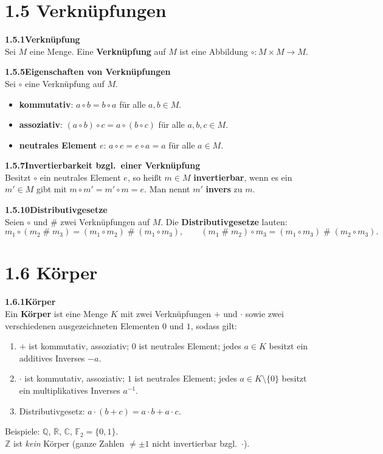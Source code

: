 \documentclass[a4paper,12pt]{article}
\newcommand{\gentry}[3]{%
  \noindent\textbf{#1\quad #2}\nopagebreak\\[0.2em]
  #3\par\smallskip
}
\begin{document}
\section*{1.5 \quad Verknüpfungen}

\gentry{1.5.1}{Verknüpfung}{%
  Sei $M$ eine Menge. Eine \textbf{Verknüpfung} auf $M$ ist eine Abbildung
  $\circ: M \times M \to M$.
}

\gentry{1.5.5}{Eigenschaften von Verknüpfungen}{%
  Sei $\circ$ eine Verknüpfung auf $M$.
  \begin{itemize}[topsep=2pt,itemsep=1pt]
    \item \textbf{kommutativ}: $a \circ b = b \circ a$ für alle $a,b \in M$.
    \item \textbf{assoziativ}: $(a \circ b) \circ c = a \circ (b \circ c)$
          für alle $a,b,c \in M$.
    \item \textbf{neutrales Element} $e$: $a \circ e = e \circ a = a$
          für alle $a \in M$.
  \end{itemize}
}

\gentry{1.5.7}{Invertierbarkeit bzgl.\ einer Verknüpfung}{%
  Besitzt $\circ$ ein neutrales Element $e$, so heißt $m \in M$
  \textbf{invertierbar}, wenn es ein $m' \in M$ gibt mit
  $m \circ m' = m' \circ m = e$.
  Man nennt $m'$ \textbf{invers} zu $m$.
}

\gentry{1.5.10}{Distributivgesetze}{%
  Seien $\circ$ und $\#$ zwei Verknüpfungen auf $M$. Die
  \textbf{Distributivgesetze} lauten:
  \[
    m_1 \circ (m_2 \mathbin{\#} m_3) = (m_1 \circ m_2) \mathbin{\#} (m_1 \circ m_3),
    \qquad
    (m_1 \mathbin{\#} m_2) \circ m_3 = (m_1 \circ m_3) \mathbin{\#} (m_2 \circ m_3).
  \]
}

\section*{1.6 \quad Körper}

\gentry{1.6.1}{Körper}{%
  Ein \textbf{Körper} ist eine Menge $K$ mit zwei Verknüpfungen $+$ und $\cdot$
  sowie zwei verschiedenen ausgezeichneten Elementen $0$ und $1$, sodass gilt:
  \begin{enumerate}[label=(\roman*),topsep=2pt,itemsep=1pt]
    \item $+$ ist kommutativ, assoziativ; $0$ ist neutrales Element;
          jedes $a \in K$ besitzt ein additives Inverses $-a$.
    \item $\cdot$ ist kommutativ, assoziativ; $1$ ist neutrales Element;
          jedes $a \in K \setminus \{0\}$ besitzt ein multiplikatives
          Inverses $a^{-1}$.
    \item Distributivgesetz: $a \cdot (b+c) = a \cdot b + a \cdot c$.
  \end{enumerate}
  Beispiele: $\mathbb{Q}$, $\mathbb{R}$, $\mathbb{C}$, $\mathbb{F}_2 = \{0,1\}$.
  \smallskip\\
  $\mathbb{Z}$ ist \emph{kein} Körper (ganze Zahlen $\neq \pm 1$ nicht invertierbar bzgl.\ $\cdot$).
}
\end{document}
